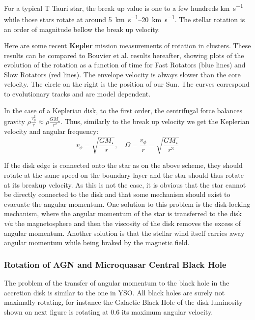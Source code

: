 \documentclass[10pt,a4paper,english]{article}
\begin{document}
For a typical T Tauri star, the break up value is one to a few hundreds \si{\km\per\s} while those stars rotate at around \SIrange{5}{20}{\km\per\s}. The stellar rotation is an order of magnitude bellow the break up velocity.

Here are some recent \textbf{Kepler} mission measurements of rotation in clusters.
These results can be compared to Bouvier et al. results hereafter, showing plots of the evolution of the rotation as a function of time for Fast Rotators (blue lines) and Slow Rotators (red lines). The envelope velocity is always slower than the core velocity. The circle on the right is the position of our Sun. The curves correspond to evolutionary tracks and are model dependent.


In the case of a Keplerian disk, to the first order, the centrifugal force balances gravity $\rho \frac{v_\phi^2}{r} \approx \rho \frac{GM_\star}{r^2}$. Thus, similarly to the break up velocity we get the Keplerian velocity and angular frequency:
\begin{equation}
    v_\phi = \sqrt{\frac{GM_\star}{r}}, \quad \Omega = \frac{v_\phi}{r} = \sqrt{\frac{GM_\star}{r^3}}
\end{equation}

If the disk edge is connected onto the star as on the above scheme, they should rotate at the same speed on the boundary layer and the star should thus rotate at its breakup velocity. As this is not the case, it is obvious that the star cannot be directly connected to the disk and that some mechanism should exist to evacuate the angular momentum. One solution to this problem is the disk-locking mechanism, where the angular momentum of the star is transferred to the disk \emph{via} the magnetosphere and then the viscosity of the disk removes the excess of angular momentum. Another solution is that the stellar wind itself carries away angular momentum while being braked by the magnetic field.
\subsubsection{Rotation of AGN and Microquasar Central Black Hole}
The problem of the transfer of angular momentum to the black hole in the accretion disk is similar to the one in YSO. All black holes are surely not maximally rotating, for instance the Galactic Black Hole of the disk luminosity shown on next figure is rotating at 0.6 its maximum angular velocity.
\end{document}
